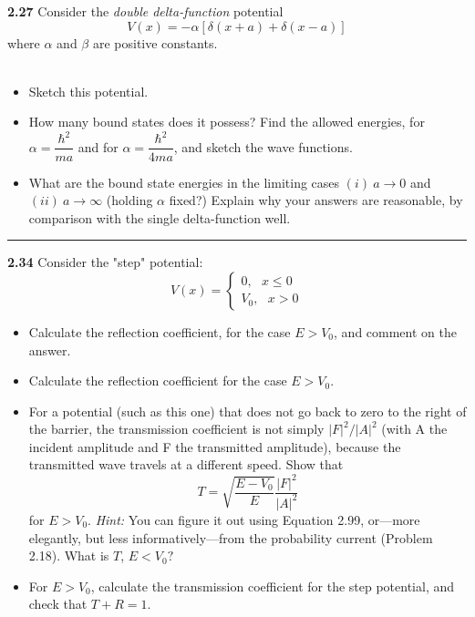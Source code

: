 \documentclass[fleqn]{article}
\begin{document}
  \textbf{2.27}
  Consider the \emph{double delta-function} potential \\
  $$V(x)=-\alpha \left[\delta(x+a)+ \delta(x-a)\right]$$
  where $\alpha$ and $\beta$ are positive constants. \\ \\
  \begin{itemize}
    \item Sketch this potential.
    

    \item How many bound states does it possess? Find the allowed energies, for 
    $\alpha =\dfrac{\hbar^2}{ma}$ and for $\alpha=\dfrac{\hbar^2}{4ma}$, and sketch 
    the wave functions.

    \item What are the bound state energies in the limiting cases $(i) ~ a \rightarrow  0$
    and $(ii) ~ a \rightarrow \infty$ (holding $\alpha$ fixed?) Explain why your answers are reasonable, by comparison with the single
    delta-function well.    
  \end{itemize}


  \rule{15cm}{1pt}

  \textbf{2.34}
  Consider the "step" potential: 
  $$V(x)=\begin{cases}
    0, ~~~ x\leqslant 0 \\
    V_0, ~~~ x > 0
  \end{cases}$$
\begin{itemize}
  \item Calculate the reflection coefficient, for the case $E>V_0$, and comment on the answer.

  \item Calculate the reflection coefficient for the case $E>V_0$.

  \item For a potential (such as this one) that does not go back to zero to the right of the barrier,
  the transmission coefficient is not simply $|F|^2/|A|^2$ (with A the incident amplitude and F
  the transmitted amplitude), because the transmitted wave travels at a different speed. Show
  that
  $$T=\sqrt{\dfrac{E-V_0}{E}}\dfrac{|F|^2}{|A|^2}$$
  for $E>V_0$. \emph{Hint:} You can figure it out using Equation 2.99, or—more elegantly, but less
  informatively—from the probability current (Problem 2.18). What is $T$, $E<V_0?$

  \item For $E>V_0$, calculate the transmission coefficient for the step potential, and check that $T+R=1$.
  
\end{itemize}
\end{document}
